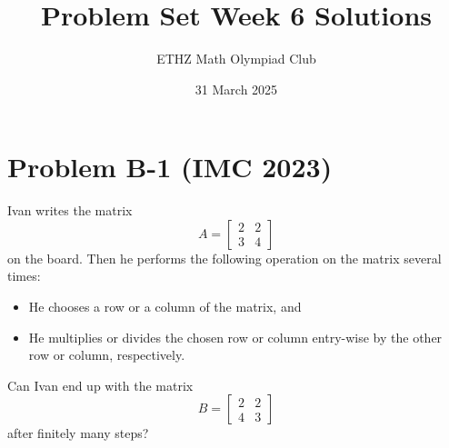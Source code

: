 \documentclass[11pt, a4paper, oneside]{article}
\title{Problem Set Week 6 Solutions}
\author{ETHZ Math Olympiad Club}
\date{31 March 2025}
\newcommand{\problem}[1][]{\section{#1} \hfill \par}
\theoremstyle{remark}
\theoremstyle{lemma}
\begin{document}
\maketitle
\problem[Problem B-1 (IMC 2023)]
Ivan writes the matrix
\[
A = \begin{bmatrix} 2 & 2 \\ 3 & 4 \end{bmatrix}
\]
on the board. Then he performs the following operation on the matrix several times:
\begin{itemize}
    \item He chooses a row or a column of the matrix, and
    \item He multiplies or divides the chosen row or column entry-wise by the other row or column, respectively.
\end{itemize}
Can Ivan end up with the matrix
\[
B = \begin{bmatrix} 2 & 2 \\ 4 & 3 \end{bmatrix}
\]
after finitely many steps?
\end{document}
